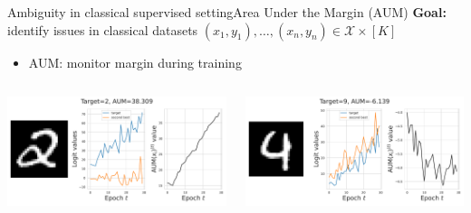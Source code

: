 \begin{frame}{Ambiguity in classical supervised setting}{Area Under the Margin (AUM)}
    \textbf{Goal:} identify issues in classical datasets $(x_1, y_1),\dots,(x_n, y_n)\in \mathcal{X}\times [K]$
\begin{itemize}
    \item AUM: monitor margin during training
\end{itemize}
\vspace{.5cm}
\begin{columns}
    \begin{column}{.47\textwidth}
        \includegraphics[width=\textwidth]{./../chapters/images/high_aum_mnist.pdf}
    \end{column}
    \begin{column}{.47\textwidth}
        \includegraphics[width=\textwidth]{./../chapters/images/mid_aum_mnist.pdf}
    \end{column}
\end{columns}
\end{frame}
